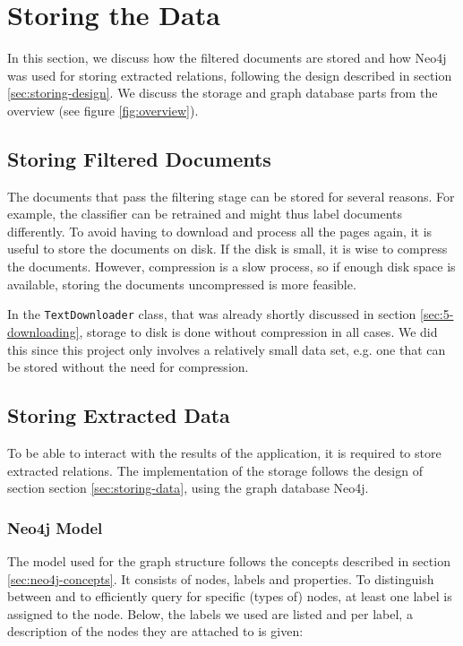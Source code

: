 \section{Storing the Data}\label{sec: 5-storing}
In this section, we discuss how the filtered documents are stored and how Neo4j was used for storing extracted relations, following the design described in section \ref{sec:storing-design}. We discuss the storage and graph database parts from the overview (see figure \ref{fig:overview}).

\subsection{Storing Filtered Documents}
The documents that pass the filtering stage can be stored for several reasons. For example, the classifier can be retrained and might thus label documents differently. To avoid having to download and process all the pages again, it is useful to store the documents on disk. If the disk is small, it is wise to compress the documents. However, compression is a slow process, so if enough disk space is available, storing the documents uncompressed is more feasible.

In the \texttt{TextDownloader} class, that was already shortly discussed in section \ref{sec:5-downloading}, storage to disk is done without compression in all cases. We did this since this project only involves a relatively small data set, e.g. one that can be stored without the need for compression.

\subsection{Storing Extracted Data}
To be able to interact with the results of the application, it is required to store extracted relations. The implementation of the storage follows the design of section section \ref{sec:storing-data}, using the graph database Neo4j.

\subsubsection{Neo4j Model}
The model used for the graph structure follows the concepts described in section \ref{sec:neo4j-concepts}. It consists of nodes, labels and properties. To distinguish between and to efficiently query for specific (types of) nodes, at least one label is assigned to the node. Below, the labels we used are listed and per label, a description of the nodes they are attached to is given:

